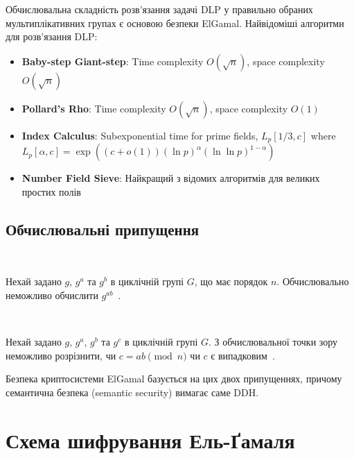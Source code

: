 Обчислювальна складність розв'язання задачі DLP у правильно обраних мультиплікативних групах є основою безпеки ElGamal. 
Найвідоміші алгоритми для розв'язання DLP:
\begin{itemize}
    \item \textbf{Baby-step Giant-step}: Time complexity $O(\sqrt{n})$, space complexity $O(\sqrt{n})$~\cite{shanks1971class}
    \item \textbf{Pollard's Rho}: Time complexity $O(\sqrt{n})$, space complexity $O(1)$~\cite{pollard1978monte}
    \item \textbf{Index Calculus}: Subexponential time for prime fields, $L_p[1/3, c]$ where \\ 
    $L_p[\alpha, c] = \exp((c + o(1))(\ln p)^\alpha(\ln \ln p)^{1-\alpha})$~\cite{gordon1993discrete}
    \item \textbf{Number Field Sieve}: Найкращий з відомих алгоритмів для великих простих полів~\cite{schirokauer1993discrete}
\end{itemize}

\subsection{Обчислювальні припущення}

\begin{definition}
    ~\par Нехай задано $g$, $g^{a}$ та $g^{b}$ в циклічній групі $G$, що має порядок $n$. Обчислювально неможливо 
    обчислити $g^{ab}$~\cite{boneh1998decision}.
\end{definition}

\begin{definition}
    ~\par Нехай задано $g$, $g^{a}$, $g^{b}$ та $g^{c}$ в циклічній групі $G$. З обчислювальної точки зору неможливо 
    розрізнити, чи $c = ab \pmod{n}$ чи $c$ є випадковим~\cite{boneh1998decision}.
\end{definition}

\noindent Безпека криптосистеми ElGamal базується на цих двох припущеннях, причому семантична безпека (semantic security) 
вимагає саме DDH.

\section{Схема шифрування Ель-Ґамаля}

